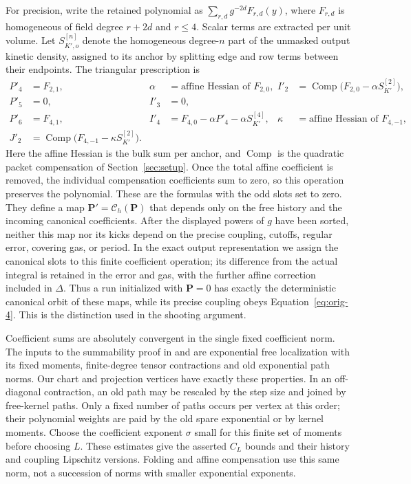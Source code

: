 For precision, write the retained polynomial as
$\sum_{r,d}g^{-2d}F_{r,d}(y)$, where $F_{r,d}$ is homogeneous of field
degree $r+2d$ and $r\le4$.  Scalar terms are extracted per unit
volume.  Let $S_{K',o}^{[n]}$ denote the homogeneous degree-$n$ part
of the unmasked output kinetic density, assigned to its anchor by
splitting edge and row terms between their endpoints.  The triangular
prescription is
\begin{align*}
 P'_4&=F_{2,1},&
 \alpha&=\text{affine Hessian of }F_{2,0},&
 I'_2&=\operatorname{Comp}\bigl(F_{2,0}-\alpha S_{K'}^{[2]}\bigr),\\
 P'_5&=0,& I'_3&=0,\\
 P'_6&=F_{4,1},&
 I'_4&=F_{4,0}-\alpha P'_4-\alpha S_{K'}^{[4]},&
 \kappa&=\text{affine Hessian of }F_{4,-1},\\
 J'_2&=\operatorname{Comp}\bigl(F_{4,-1}-\kappa S_{K'}^{[2]}\bigr).
\end{align*}
Here the affine Hessian is the bulk sum per anchor, and
$\operatorname{Comp}$ is the quadratic packet compensation of
Section~\ref{sec:setup}.  Once the total affine coefficient is
removed, the individual compensation coefficients sum to zero, so
this operation preserves the polynomial.  These are the formulas
 with the odd slots set to zero.  They define a map
$\mathbf P'=\mathcal C_h(\mathbf P)$ that depends only on the free
history and the incoming canonical coefficients.  After the displayed
powers of $g$ have been sorted, neither this map nor its kicks depend
on the precise coupling, cutoffs, regular error, covering gas, or
period.  In the exact output representation we assign the canonical
slots to this finite coefficient operation; its difference from the
actual integral is retained in the error and gas, with the further
affine correction included in $\Delta$.  Thus a run initialized with
$\mathbf P=0$ has exactly the deterministic canonical orbit of these
maps, while its precise coupling obeys Equation~\eqref{eq:orig-4}.
This is the distinction used in the shooting argument.

Coefficient sums are absolutely convergent in the single fixed
coefficient norm.  The inputs to the summability proof in
 and
 are exponential free localization
with its fixed moments, finite-degree tensor contractions and old
exponential path norms.  Our chart and projection vertices have
exactly these properties.  In an off-diagonal contraction, an old
path may be rescaled by the step size and joined by free-kernel
paths.  Only a fixed number of paths occurs per vertex at this order;
their polynomial weights are paid by the old spare exponential or
by kernel moments.  Choose the coefficient exponent $\sigma$ small
for this finite set of moments before choosing $L$.  These estimates
give the asserted $C_L$ bounds and their history and coupling
Lipschitz versions.  Folding and affine compensation use this same
norm, not a succession of norms with smaller exponential exponents.

